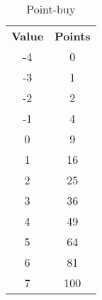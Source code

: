 \begin{table}[h!]
    \begin{tabular}{c c}
        \bfseries{Value} & \bfseries{Points} \\
        -4 & 0 \\
        -3 & 1 \\
        -2 & 2 \\
        -1 & 4 \\
        0 & 9 \\
        1 & 16 \\
        2 & 25 \\
        3 & 36 \\
        4 & 49 \\
        5 & 64 \\
        6 & 81 \\
        7 & 100 \\
    \end{tabular}
    \label{tab:point-buy}
    \caption{Point-buy}
\end{table}
